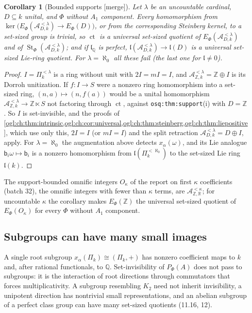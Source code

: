 \documentclass[11pt,oneside]{article}
\numberwithin{equation}{section}
\newtheorem{corollary}[corollary]{Corollary}
\theoremstyle{definition}
\theoremstyle{remark}
\newcommand{\Z}{\mathbb Z}
\newcommand{\Q}{\mathbb Q}
\newcommand{\R}{\mathbb R}
\newcommand{\A}{\mathcal A}
\newcommand{\ct}{\operatorname{ct}}
\newcommand{\St}{\operatorname{St}}
\newcommand{\mergetag}{\textup{\textsf{\small[merge]}}}
\newcommand{\replabel}[1]{\nolinkurl{#1}}
\begin{document}
\begin{corollary}[Bounded supports \mergetag]\label{ogl:ch:cor:support}
Let $\lambda$ be an uncountable cardinal, $D\subseteq k$ unital, and $\Phi$ without
$A_1$ component. Every homomorphism from
$\ker\bigl(E_\Phi(\A^{<\lambda}_{D,k})\to E_\Phi(D)\bigr)$, or from the corresponding
Steinberg kernel, to a set-sized group is trivial, so $\ct$ is a universal
set-sized quotient of $E_\Phi(\A^{<\lambda}_{D,k})$ and of $\St_\Phi(\A^{<\lambda}_{D,k})$;
and if $\mathfrak l_\Q$ is perfect, $\mathfrak l(\A^{<\lambda}_{D,k})\to\mathfrak l(D)$ is a
universal set-sized Lie-ring quotient. For $\lambda=\aleph_0$ all these fail (the
last one for $\mathfrak l\ne0$).
\end{corollary}
\begin{proof}
$I=\Pi_k^{<\lambda}$ is a ring without unit with $2I=mI=I$, and
$\A^{<\lambda}_{\Z,k}=\Z\oplus I$ is its Dorroh unitization. If $f:I\to S$ were a nonzero
ring homomorphism into a set-sized ring, $(n,a)\mapsto(n,f(a))$ would be a unital
homomorphism $\A^{<\lambda}_{\Z,k}\to\Z\ltimes S$ not factoring through $\ct$,
against \replabel{osq:thm:support}(i) with $D=\Z$. So $I$ is set-invisible, and the
proofs of \cref{ogl:ch:thm:intrinsic,ogl:ch:cor:universal,ogl:ch:thm:steinberg,ogl:ch:thm:liepositive},
which use only this, $2I=I$ (or $mI=I$) and the split retraction
$\A^{<\lambda}_{D,k}=D\oplus I$, apply. For $\lambda=\aleph_0$ the augmentation above
detects $x_\alpha(\omega)$, and its Lie analogue $\mathsf b_i\omega\mapsto\mathsf b_i$ is a
nonzero homomorphism from $\mathfrak l(\Pi_k^{<\aleph_0})$ to the set-sized Lie ring
$\mathfrak l(k)$.
\end{proof}

The support-bounded omnific integers $O_\kappa$ of the report on first $\kappa$
coefficients (batch 32), the omnific integers with fewer than $\kappa$ terms, are
$\A^{<\kappa}_{\Z,\R}$; for uncountable $\kappa$ the corollary makes $E_\Phi(\Z)$ the
universal set-sized quotient of $E_\Phi(O_\kappa)$ for every $\Phi$ without $A_1$
component.

\subsection{Subgroups can have many small images}\label{ogl:ch:sub:subgroups}
A single root subgroup $x_\alpha(\Pi_k)\cong(\Pi_k,+)$ has nonzero coefficient
maps to $k$ and, after rational functionals, to $\Q$. Set-invisibility of
$P_\Phi(A)$ does not pass to subgroups: it is the interaction of root directions
through commutators that forces multiplicativity. A subgroup resembling $K_2$
need not inherit invisibility, a unipotent direction has nontrivial small
representations, and an abelian subgroup of a perfect class group can have many
set-sized quotients (11.16, 12).
\end{document}
